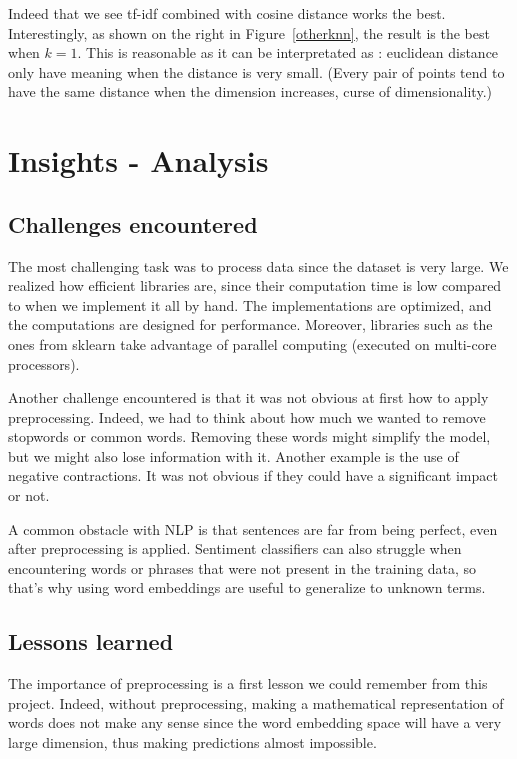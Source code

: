 \documentclass{article}
\begin{document}
Indeed that we see tf-idf combined with cosine distance works the best. Interestingly,
as shown on the right in Figure~\ref{otherknn}, the result is the best when $k=1$.
This is reasonable as it can be interpretated as : euclidean distance only have meaning when
the distance is very small. (Every pair of points tend to have the same distance when the dimension
increases, curse of dimensionality.)

\section{Insights - Analysis}

\subsection{Challenges encountered}

The most challenging task was to process data since the dataset is very large. We realized how efficient libraries are, since their computation time is low compared to when we implement it all by hand.
The implementations are optimized, and the computations are designed for performance. Moreover, libraries such as the ones from sklearn take advantage of parallel computing (executed on multi-core processors). 

Another challenge encountered is that it was not obvious at first how to apply preprocessing. Indeed, we had to think about how much we wanted to remove stopwords or common words. Removing these words might simplify the model, but we might also lose information with it. Another example is the use of negative contractions. It was not obvious if they could have a significant impact or not.

A common obstacle with NLP is that sentences are far from being perfect, even after preprocessing is applied. Sentiment classifiers can also struggle when encountering words or phrases that were not present in the training data, so that's why using word embeddings are useful to generalize to unknown terms. 

\subsection{Lessons learned}

The importance of preprocessing is a first lesson we could remember from this project. Indeed, without preprocessing, making a mathematical representation of words does not make any sense since the word embedding space will have a very large dimension, thus making predictions almost impossible.
\end{document}
